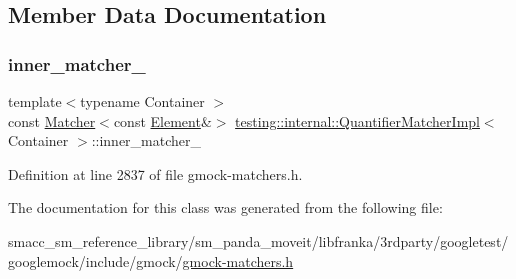 \subsection{Member Data Documentation}
\mbox{\label{classtesting_1_1internal_1_1QuantifierMatcherImpl_af0ee2a4697f5cb8e937fd29dd75e2a30}} 
\subsubsection{\texorpdfstring{inner\+\_\+matcher\+\_\+}{inner\_matcher\_}}
{\footnotesize\ttfamily template$<$typename Container $>$ \\
const \hyperlink{classtesting_1_1Matcher}{Matcher}$<$const \hyperlink{classtesting_1_1internal_1_1QuantifierMatcherImpl_a6f73e2e5fa853f8b5fdd33d6a1811f9e}{Element}\&$>$ \hyperlink{classtesting_1_1internal_1_1QuantifierMatcherImpl}{testing\+::internal\+::\+Quantifier\+Matcher\+Impl}$<$ Container $>$\+::inner\+\_\+matcher\+\_\+\hspace{0.3cm}{\ttfamily [protected]}}



Definition at line 2837 of file gmock-\/matchers.\+h.



The documentation for this class was generated from the following file\+:\begin{DoxyCompactItemize}
\item 
smacc\+\_\+sm\+\_\+reference\+\_\+library/sm\+\_\+panda\+\_\+moveit/libfranka/3rdparty/googletest/googlemock/include/gmock/\hyperlink{gmock-matchers_8h}{gmock-\/matchers.\+h}\end{DoxyCompactItemize}
